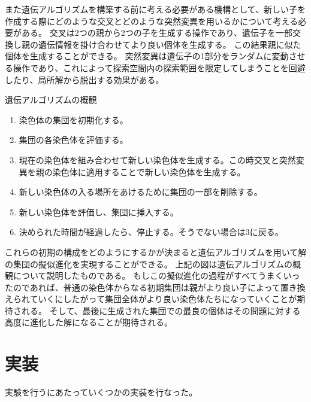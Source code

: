\documentclass[titlepage]{jsarticle}
\begin{document}
また遺伝アルゴリズムを構築する前に考える必要がある機構として、新しい子を作成する際にどのような交叉とどのような突然変異を用いるかについて考える必要がある。
交叉は2つの親から2つの子を生成する操作であり、遺伝子を一部交換し親の遺伝情報を掛け合わせてより良い個体を生成する。
この結果親に似た個体を生成することができる。
突然変異は遺伝子の1部分をランダムに変動させる操作であり、これによって探索空間内の探索範囲を限定してしまうことを回避したり、局所解から脱出する効果がある。

\hfill \break
\begin{itembox}[c]{遺伝アルゴリズムの概観}
	\begin{enumerate}
		\item 染色体の集団を初期化する。
		\item 集団の各染色体を評価する。
		\item 現在の染色体を組み合わせて新しい染色体を生成する。この時交叉と突然変異を親の染色体に適用することで新しい染色体を生成する。
		\item 新しい染色体の入る場所をあけるために集団の一部を削除する。
		\item 新しい染色体を評価し、集団に挿入する。
		\item 決められた時間が経過したら、停止する。そうでない場合は3に戻る。
	\end{enumerate}
\end{itembox}
\hfill \break


これらの初期の構成をどのようにするかが決まると遺伝アルゴリズムを用いて解の集団の擬似進化を実現することができる。
上記の図は遺伝アルゴリズムの概観について説明したものである。
もしこの擬似進化の過程がすべてうまくいったのであれば、普通の染色体からなる初期集団は親がより良い子によって置き換えられていくにしたがって集団全体がより良い染色体たちになっていくことが期待される。
そして、最後に生成された集団での最良の個体はその問題に対する高度に進化した解になることが期待される。










\section{実装}





実験を行うにあたっていくつかの実装を行なった。
\end{document}
